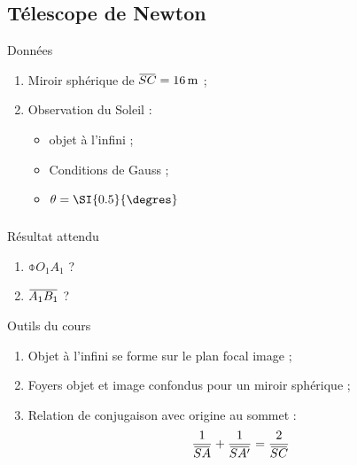 \documentclass[10pt,a5paper,notitlepage]{book}
\begin{document}
\subsection{Télescope de Newton}
\begin{NCdefi}{Données}
    \begin{enumerate}
        \item Miroir sphérique de $\SC = \SI{16}{m}$ ;
        \item Observation du Soleil :
            \begin{itemize}
                \item objet à l'infini ;
                \item Conditions de Gauss ;
                \item $\t = \SI{0.5}{\degres}$
            \end{itemize}
    \end{enumerate}
\end{NCdefi}

\subsubsection{}

\begin{NCprop}{Résultat attendu}
    \begin{enumerate}
        \item $\obar{O_1A_1}$ ?
        \item $\ABa$ ?
    \end{enumerate}
\end{NCprop}

\begin{NCdemo}{Outils du cours}
    \begin{enumerate}
        \item Objet à l'infini se forme sur le plan focal image ;
        \item Foyers objet et image confondus pour un miroir sphérique ;
        \item Relation de conjugaison avec origine au sommet :
            \[ \frac{1}{\SA} + \frac{1}{\SAp} = \frac{2}{\SC} \]
    \end{enumerate}
\end{NCdemo}
\end{document}
